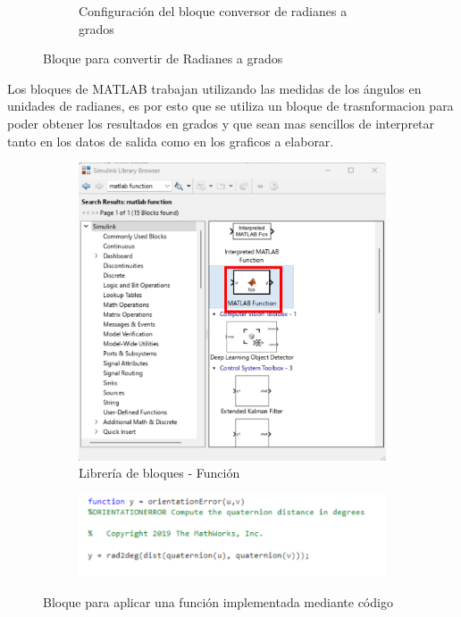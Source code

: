 \begin{figure}[htbp]
\begin{subfigure}[b]{0.45\textwidth}
        \caption{Configuración del bloque conversor de radianes a grados}
        \label{fig:conf_bloques_R2D}
    \end{subfigure}
    \caption{Bloque para convertir de Radianes a grados}
    \label{fig:bloques_R2D}
\end{figure}

Los bloques de MATLAB trabajan utilizando las medidas de los ángulos en unidades de radianes, es por esto que se utiliza un bloque de trasnformacion para poder obtener los resultados en grados y que sean mas sencillos de interpretar tanto en los datos de salida como en los graficos a elaborar.



\begin{figure}[htbp]
    \centering
    \begin{subfigure}[b]{0.35\textwidth}
        \centering
        \includegraphics[width=\textwidth]{fig/Capitulo5/Caso_de_estudio_IMU/Generador_de_salidas/libreria_bloque_de_funcion.pdf}
        \caption{Librería de bloques - Función}
        \label{fig:lib_bloques_func}
    \end{subfigure}
    \hfill
    \begin{subfigure}[b]{0.45\textwidth}
        \centering
        \includegraphics[width=\textwidth]{fig/Capitulo5/Caso_de_estudio_IMU/Generador_de_salidas/configuracion_codigo.pdf}
        \caption{}
        \label{fig:config_bloques_func}
    \end{subfigure}
    \caption{Bloque para aplicar una función implementada mediante código}
    \label{fig:bloques_func}
\end{figure}

